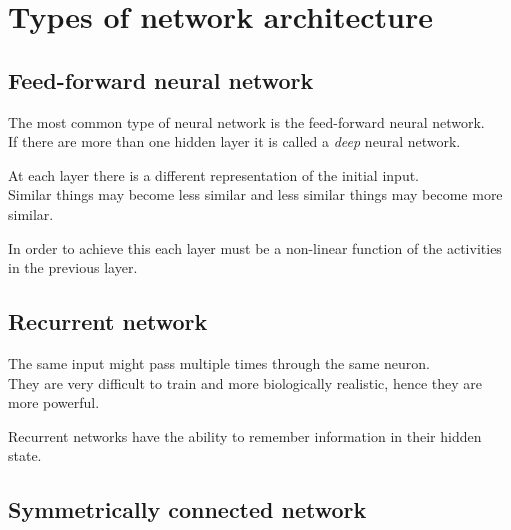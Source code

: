 \documentclass{article}
\begin{document}
\pagebreak


\section{Types of network architecture}

\subsection{Feed-forward neural network}

The most common type of neural network is the feed-forward neural network. \\
If there are more than one hidden layer it is called a \textit{deep} neural network.

\begin{center}
    \begin{neuralnetwork}[height=4]
        \hiddenlayer[count=4, bias=false, title=Hidden\\units] \linklayers{}
        \outputlayer[count=2, title=Output\\units] \linklayers{}
    \end{neuralnetwork}
\end{center}

At each layer there is a different representation of the initial input. \\
Similar things may become less similar and less similar things may become more similar.

In order to achieve this each layer must be a non-linear function of the activities in the previous layer.

\subsection{Recurrent network}

The same input might pass multiple times through the same neuron. \\
They are very difficult to train and more biologically realistic, hence they are more powerful.

Recurrent networks have the ability to remember information in their hidden state.

\subsection{Symmetrically connected network}
\end{document}
